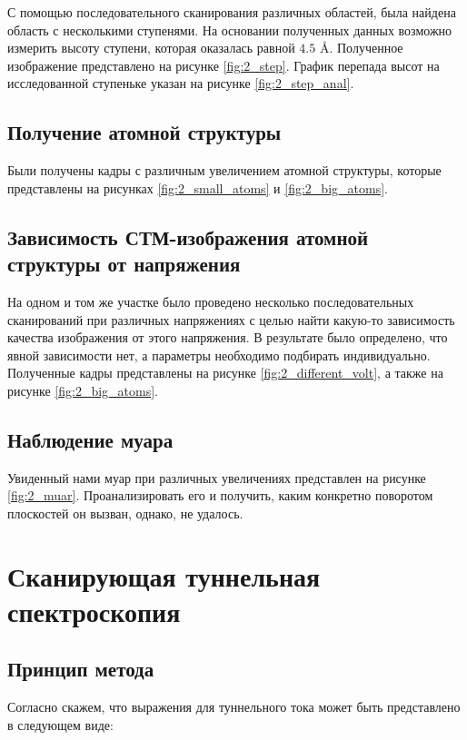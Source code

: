 \documentclass[a4paper, 12pt]{article}
\begin{document}
	С помощью последовательного сканирования различных областей, была найдена область с несколькими ступенями. На основании полученных данных возможно измерить высоту ступени, которая оказалась равной $4.5$ \AA. Полученное изображение представлено на рисунке \ref{fig:2_step}. График перепада высот на исследованной ступеньке указан на рисунке \ref{fig:2_step_anal}.
	
	\subsection{Получение атомной структуры}
	
	Были получены кадры с различным увеличением атомной структуры, которые представлены на рисунках \ref{fig:2_small_atoms} и \ref{fig:2_big_atoms}.
	
	\subsection{Зависимость СТМ-изображения атомной структуры от напряжения}
	
	На одном и том же участке было проведено несколько последовательных сканирований при различных напряжениях с целью найти какую-то зависимость качества изображения от этого напряжения. В результате было определено, что явной зависимости нет, а параметры необходимо подбирать индивидуально. Полученные кадры представлены на рисунке \ref{fig:2_different_volt}, а также на рисунке \ref{fig:2_big_atoms}.
	
	\subsection{Наблюдение муара}
	
	Увиденный нами муар при различных увеличениях представлен на рисунке \ref{fig:2_muar}. Проанализировать его и получить, каким конкретно поворотом плоскостей он вызван, однако, не удалось.
	
	\section{Сканирующая туннельная спектроскопия}
	
	\subsection{Принцип метода}
	
	Согласно \cite{Mironov} скажем, что выражения для туннельного тока может быть представлено в следующем виде:
	
\end{document}
